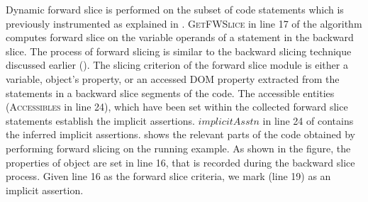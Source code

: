 Dynamic forward slice is performed on the subset of code statements which is previously instrumented as explained in . 
\textsc{GetFWSlice} in line 17 of the algorithm computes forward slice on the variable operands of a statement in the backward slice.
The process of forward slicing is similar to the backward slicing technique discussed earlier (). The slicing criterion of the forward slice module is either a variable, object's property, or an accessed DOM property extracted from the statements in a backward slice segments of the code. The accessible entities (\textsc{Accessibles} in line 24), which have been set within the collected forward slice statements establish the implicit assertions.
$implicitAsstn$ in line 24 of  contains the inferred implicit assertions.
 shows the relevant parts of the code obtained by performing forward slicing on the running example. 
As shown in the figure, the properties of object  are set in line 16, that is recorded during the backward slice process. Given line 16 as the forward slice criteria, we mark  (line 19) as an implicit assertion.        
